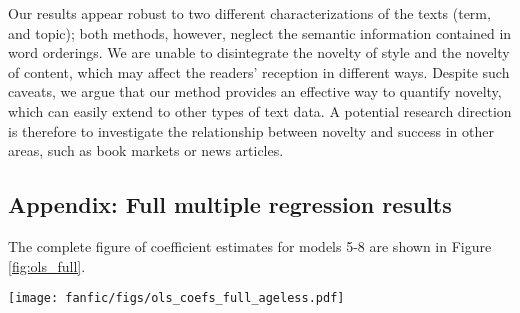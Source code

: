 \documentclass[letterpaper]{article} %
\begin{document}
Our results appear robust to two different characterizations of the texts (term, and topic); both methods, however, neglect the semantic information contained in word orderings. We are unable to disintegrate the novelty of style and the novelty of content, which may affect the readers' reception in different ways. Despite such caveats, we argue that our method provides an effective way to quantify novelty, which can easily extend to other types of text data. A potential research direction is therefore to investigate the relationship between novelty and success in other areas, such as book markets or news articles.





\appendix

\subsection{Appendix: Full multiple regression results}
The complete figure of coefficient estimates for models 5-8 are shown in Figure \ref{fig:ols_full}.

\begin{figure*}
    \centering
          \texttt{[image: fanfic/figs/ols\_coefs\_full\_ageless.pdf]}
        \caption{OLS coefficients for models 5-8. 95\% confidence intervals are shown. N = 662793.}
        \label{fig:ols_full}
\end{figure*}
\end{document}
